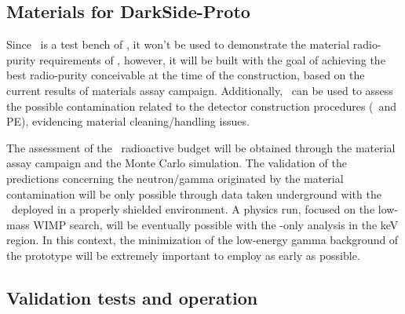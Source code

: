 \subsection{Materials for DarkSide-Proto}

Since \DSps\ is a test bench of \DSks, it won't be used to demonstrate the material radio-purity requirements of \DSks, however, it will be built with the goal of achieving the best radio-purity conceivable at the time of the construction, based on the current results of materials assay campaign. Additionally, \DSps\ can be used to assess the possible contamination related to the detector construction procedures (\TPC\ and PE), evidencing material cleaning/handling issues.

The assessment of the \DSps\ radioactive budget will be obtained through the material assay campaign and the Monte Carlo simulation. The validation of the predictions concerning the neutron/gamma originated by the material contamination will be only possible through data taken underground with the \DSps\ deployed in a properly shielded environment. A physics run, focused on the low-mass WIMP search, will be eventually possible with the \STwo-only analysis in the keV region. In this context, the minimization of the low-energy gamma background of the prototype will be extremely important to employ as early as possible.


\subsection{Validation tests and operation}

